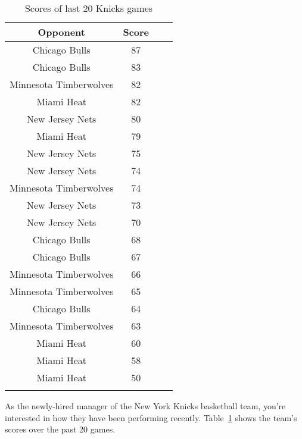 \documentclass[11pt]{exam}
\begin{document}
\begin{questions}
\begin{table}[ht]
\begin{center}
\begin{tabular}{|c|c|p{3cm}|p{3cm}|}
  \hline
Opponent & Score &  &  \\ 
  \hline
Chicago Bulls & 87 &  &  \\ 
   \hline
Chicago Bulls & 83 &  &  \\ 
   \hline
Minnesota Timberwolves & 82 &  &  \\ 
   \hline
Miami Heat & 82 &  &  \\ 
   \hline
New Jersey Nets & 80 &  &  \\ 
   \hline
Miami Heat & 79 &  &  \\ 
   \hline
New Jersey Nets & 75 &  &  \\ 
   \hline
New Jersey Nets & 74 &  &  \\ 
   \hline
Minnesota Timberwolves & 74 &  &  \\ 
   \hline
New Jersey Nets & 73 &  &  \\ 
   \hline
New Jersey Nets & 70 &  &  \\ 
   \hline
Chicago Bulls & 68 &  &  \\ 
   \hline
Chicago Bulls & 67 &  &  \\ 
   \hline
Minnesota Timberwolves & 66 &  &  \\ 
   \hline
Minnesota Timberwolves & 65 &  &  \\ 
   \hline
Chicago Bulls & 64 &  &  \\ 
   \hline
Minnesota Timberwolves & 63 &  &  \\ 
   \hline
Miami Heat & 60 &  &  \\ 
   \hline
Miami Heat & 58 &  &  \\ 
   \hline
Miami Heat & 50 &  &  \\ 
   \hline
\hline
 &  &  &  \\ 
   \hline
\end{tabular}
\caption{Scores of last 20 Knicks games}
\label{tab:knicks}
\end{center}
\end{table}\fi

  \question As the newly-hired manager of the New York Knicks basketball
  team, you're interested in how they have been performing recently.
  Table~\ref{tab:knicks} shows the team's scores over the past 20 games.

\end{questions}
\end{document}
